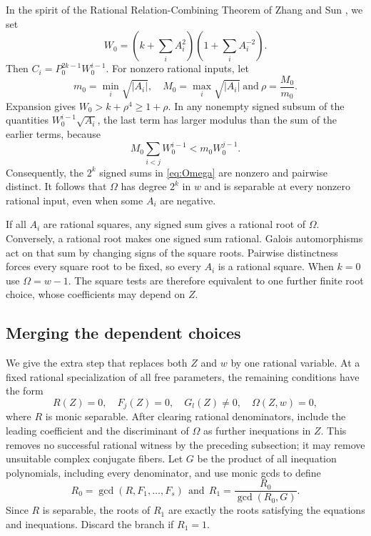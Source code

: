 \documentclass[11pt,reqno]{amsart}
\theoremstyle{definition}
\numberwithin{equation}{section}
\def\t{\text}
\def\f{\frac}
\begin{document}
In the spirit of the Rational Relation-Combining Theorem of Zhang and Sun \cite[Theorem 1.2]{ZS}, we set
\[
 W_0=\left(k+\sum_i A_i^2\right)\left(1+\sum_i A_i^{-2}\right).
\]
Then $C_i=P_0^{2k-1}W_0^{i-1}$. For nonzero rational inputs, let
\[
 m_0=\min_i\sqrt{|A_i|},\quad M_0=\max_i\sqrt{|A_i|}\ \t{and}\ \rho=\f{M_0}{m_0}.
\]
Expansion gives $W_0>k+\rho^4\ge1+\rho$. In any nonempty signed subsum of the quantities $W_0^{i-1}\sqrt{A_i}$, the last term has larger modulus than the sum of the earlier terms, because
\[
 M_0\sum_{i<j}W_0^{i-1}<m_0W_0^{j-1}.
\]
Consequently, the $2^k$ signed sums in \eqref{eq:Omega} are nonzero and pairwise distinct. It follows that $\Omega$ has degree $2^k$ in $w$ and is separable at every nonzero rational input, even when some $A_i$ are negative.

If all $A_i$ are rational squares, any signed sum gives a rational root of $\Omega$. Conversely, a rational root makes one signed sum rational. Galois automorphisms act on that sum by changing signs of the square roots. Pairwise distinctness forces every square root to be fixed, so every $A_i$ is a rational square. When $k=0$ use $\Omega=w-1$. The square tests are therefore equivalent to one further finite root choice, whose coefficients may depend on $Z$.

\subsection{Merging the dependent choices}
We give the extra step that replaces both $Z$ and $w$ by one rational variable. At a fixed rational specialization of all free parameters, the remaining conditions have the form
\begin{equation}\label{eq:oldsystem}
 R(Z)=0,\quad F_j(Z)=0,\quad G_l(Z)\ne0,
 \quad\Omega(Z,w)=0,
\end{equation}
where $R$ is monic separable. After clearing rational denominators, include the leading coefficient and the discriminant of $\Omega$ as further inequations in $Z$. This removes no successful rational witness by the preceding subsection; it may remove unsuitable complex conjugate fibers. Let $G$ be the product of all inequation polynomials, including every denominator, and use monic gcds to define
\begin{equation}\label{eq:filter}
 R_0=\gcd(R,F_1,\ldots,F_s)\ \ \t{and}\ \ 
 R_1=\f{R_0}{\gcd(R_0,G)}.
\end{equation}
Since $R$ is separable, the roots of $R_1$ are exactly the roots satisfying the equations and inequations. Discard the branch if $R_1=1$.
\end{document}
